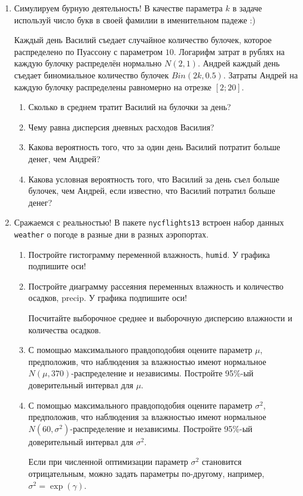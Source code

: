\begin{enumerate}
\item Симулируем бурную деятельность!
В качестве параметра $k$ в задаче используй число букв в своей фамилии в именительном падеже :)

Каждый день Василий съедает случайное количество булочек, которое распределено по Пуассону с параметром $10$. Логарифм затрат в рублях на каждую булочку распределён нормально $N(2, 1)$.
Андрей каждый день съедает биномиальное количество булочек $Bin(2k, 0.5)$. Затраты Андрей на каждую булочку распределены равномерно на отрезке $[2;20]$.

\begin{enumerate}
\item Сколько в среднем тратит Василий на булочки за день?
\item Чему равна дисперсия дневных расходов Василия?
\item Какова вероятность того, что за один день Василий потратит больше денег,
чем Андрей?
\item Какова условная вероятность того,
что Василий за день съел больше булочек, чем Андрей,
если известно, что Василий потратил больше денег?
\end{enumerate}


\item Сражаемся с реальностью!
В пакете \verb|nycflights13| встроен набор данных \verb|weather| о погоде в разные дни в разных аэропортах.
\begin{enumerate}
	\item Постройте гистограмму переменной влажность, \verb|humid|.
	У графика подпишите оси!

\item Постройте диаграмму рассеяния переменных влажность и количество осадков,
precip. У графика подпишите оси!

Посчитайте выборочное среднее и выборочную дисперсию влажности и количества осадков.

\item С помощью максимального правдоподобия оцените параметр $\mu$,
предположив, что наблюдения за влажностью имеют нормальное $N\left(\mu, 370\right)$-распределение и независимы.
Постройте 95\%-ый доверительный интервал для $\mu$.

\item С помощью максимального правдоподобия оцените параметр $\sigma^2$,
предположив, что наблюдения за влажностью имеют нормальное $N\left(60, \sigma^2\right)$-распределение и независимы.
Постройте 95\%-ый доверительный интервал для $\sigma^2$.

Если при численной оптимизации параметр $\sigma^2$ становится отрицательным,
можно задать параметры по-другому, например, $\sigma^2 = \exp(\gamma)$.
\end{enumerate}
\end{enumerate}
